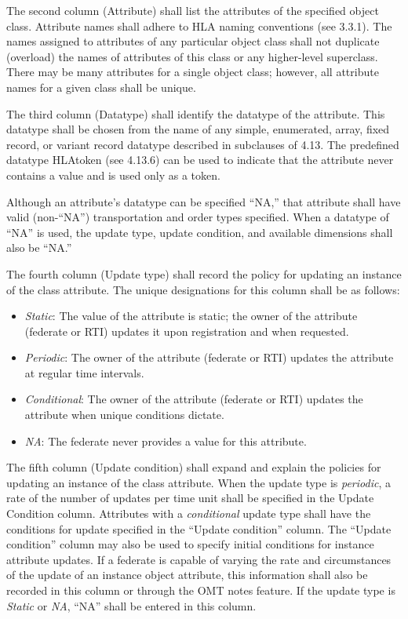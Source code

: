 The second column (Attribute) shall list the attributes of the specified object class. Attribute names shall adhere to HLA naming conventions (see 3.3.1). The names assigned to attributes of any particular object class shall not duplicate (overload) the names of attributes of this class or any higher-level superclass. There may be many attributes for a single object class; however, all attribute names for a given class shall be unique.

The third column (Datatype) shall identify the datatype of the attribute. This datatype shall be chosen from the name of any simple, enumerated, array, fixed record, or variant record datatype described in subclauses of 4.13. The predefined datatype HLAtoken (see 4.13.6) can be used to indicate that the attribute never contains a value and is used only as a token.

Although an attribute's datatype can be specified ``NA,'' that attribute shall have valid (non-``NA'') transportation and order types specified. When a datatype of ``NA'' is used, the update type, update condition, and available dimensions shall also be ``NA.''

The fourth column (Update type) shall record the policy for updating an instance of the class attribute. The unique designations for this column shall be as follows:
\begin{itemize}[topsep=1pt,itemsep=1.5pt]
\item \textit{Static}: The value of the attribute is static; the owner of the attribute (federate or RTI) updates it upon registration and when requested.
\item \textit{Periodic}: The owner of the attribute (federate or RTI) updates the attribute at regular time intervals.
\item \textit{Conditional}: The owner of the attribute (federate or RTI) updates the attribute when unique conditions dictate.
\item \textit{NA}: The federate never provides a value for this attribute.
\end{itemize}

\newpage
The fifth column (Update condition) shall expand and explain the policies for updating an instance of the class attribute. When the update type is \textit{periodic}, a rate of the number of updates per time unit shall be specified in the Update Condition column. Attributes with a \textit{conditional} update type shall have the conditions for update specified in the ``Update condition'' column. The ``Update condition'' column may also be used to specify initial conditions for instance attribute updates. If a federate is capable of varying the rate and circumstances of the update of an instance object attribute, this information shall also be recorded in this column or through the OMT notes feature. If the update type is \textit{Static} or \textit{NA}, ``NA'' shall be entered in this column.


